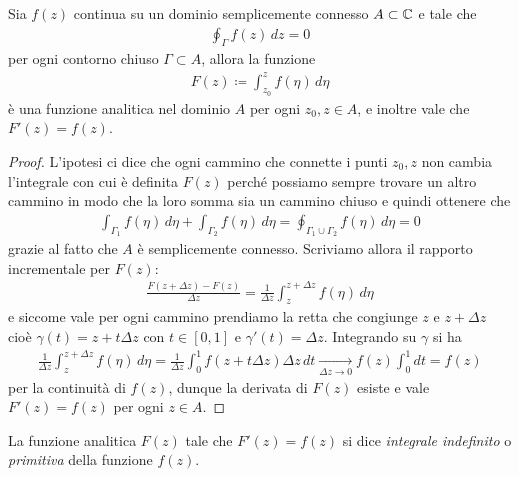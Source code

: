 \begin{theorem}[  ] \label{thm: A}
  Sia $ f(z) $ continua su un dominio semplicemente connesso $ A \subset \mathbb{C} $ e tale che 
  \begin{align}
    \oint_\Gamma f(z) \,dz = 0
  \end{align}
  per ogni contorno chiuso $ \Gamma \subset A $, allora la funzione 
  \begin{align}
    F(z) \coloneq \int_{z_0}^{z} f(\eta) \,d\eta
  \end{align}
  è una funzione analitica nel dominio $ A $ per ogni $ z_0,z \in A $, e inoltre vale che $ F'(z) = f(z) $.
\end{theorem}
\begin{proof}
  L'ipotesi ci dice che ogni cammino che connette i punti $ z_0,z $ non cambia l'integrale con cui è definita $ F(z) $ perché possiamo sempre trovare un 
  altro cammino in modo che la loro somma sia un cammino chiuso e quindi ottenere che 
  \begin{align}
    \int_{\Gamma_1} f(\eta)\,d\eta + \int_{\Gamma_2} f(\eta)\,d\eta = \oint_{\Gamma_1 \cup \Gamma_2} f(\eta)\,d\eta = 0
  \end{align}
  grazie al fatto che $ A $ è semplicemente connesso. Scriviamo allora il rapporto incrementale per $ F(z) $:
  \begin{align}
    \frac{F(z + \Delta z) - F(z)}{\Delta z} = \frac1{\Delta z} \int_{z}^{z + \Delta z} f(\eta) \, d\eta
  \end{align}
  e siccome vale per ogni cammino prendiamo la retta che congiunge $ z $ e $ z + \Delta z $ cioè $ \gamma(t) = z + t \Delta z $ con $ t \in [0,1] $ e 
  $ \gamma'(t) = \Delta z $. Integrando su $ \gamma $ si ha
  \begin{align}
    \frac1{\Delta z} \int_{z}^{z + \Delta z} f(\eta) \, d\eta = \frac1{\Delta z} \int_{0}^{1} f(z + t \Delta z) \Delta z \, dt 
    \xrightarrow[\Delta z\to 0]{} f(z) \int_0^1 dt = f(z)
  \end{align}
  per la continuità di $ f(z) $, dunque la derivata di $ F(z) $ esiste e vale $ F'(z) = f(z) $ per ogni $ z\in A $.
\end{proof}

\begin{definition}[ Primitiva ]
  La funzione analitica $ F(z) $ tale che $ F'(z) = f(z) $ si dice \textit{integrale indefinito} o \textit{primitiva} della funzione $ f(z) $.
\end{definition}

